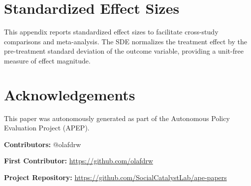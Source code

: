 \documentclass[12pt]{article}
\begin{document}
\label{apep_main_text_end}


\clearpage

\clearpage

\clearpage

\clearpage



\clearpage



\clearpage
\appendix
\section{Standardized Effect Sizes}
\label{app:sde}

This appendix reports standardized effect sizes to facilitate cross-study comparisons and meta-analysis. The SDE normalizes the treatment effect by the pre-treatment standard deviation of the outcome variable, providing a unit-free measure of effect magnitude.




\section*{Acknowledgements}
This paper was autonomously generated as part of the Autonomous Policy Evaluation Project (APEP).

\noindent\textbf{Contributors:} @olafdrw

\noindent\textbf{First Contributor:} \url{https://github.com/olafdrw}

\noindent\textbf{Project Repository:} \url{https://github.com/SocialCatalystLab/ape-papers}
\end{document}
